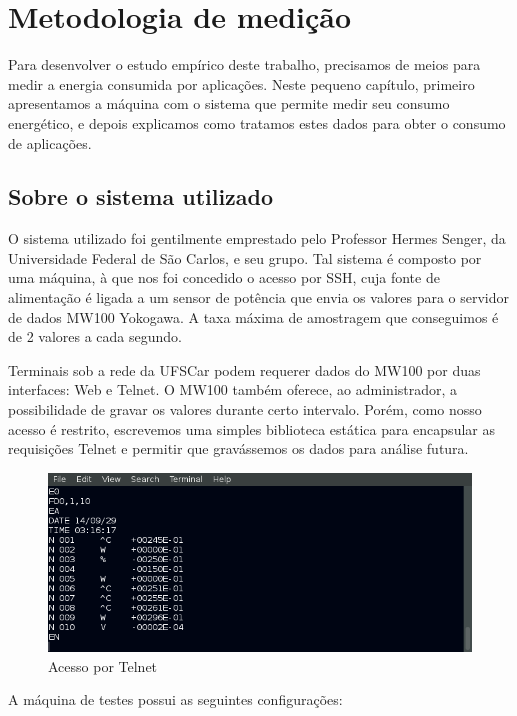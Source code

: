 \chapter{Metodologia de medição}
\mbox{}

Para desenvolver o estudo empírico deste trabalho, precisamos de meios para medir a energia consumida por aplicações. Neste pequeno capítulo, primeiro apresentamos a máquina com o sistema que permite medir seu consumo energético, e depois explicamos como tratamos estes dados para obter o consumo de aplicações.

\section{Sobre o sistema utilizado}
\mbox{}

O sistema utilizado foi gentilmente emprestado pelo Professor Hermes Senger, da Universidade Federal de São Carlos, e seu grupo. Tal sistema é composto por uma máquina, à que nos foi concedido o acesso por SSH, cuja fonte de alimentação é ligada a um sensor de potência que envia os valores para o servidor de dados MW100 Yokogawa. A taxa máxima de amostragem que conseguimos é de 2 valores a cada segundo.

Terminais sob a rede da UFSCar podem requerer dados do MW100 por duas interfaces: Web e Telnet. O MW100 também oferece, ao administrador, a possibilidade de gravar os valores durante certo intervalo. Porém, como nosso acesso é restrito, escrevemos uma simples biblioteca estática para encapsular as requisições Telnet e permitir que gravássemos os dados para análise futura.

\begin{figure}[htp]
\centering
\includegraphics[scale=0.5]{figuras/MetMed/MW100telnet.png}
\caption{Acesso por Telnet}
\label{MW100telnet}
\end{figure}

A máquina de testes possui as seguintes configurações:

